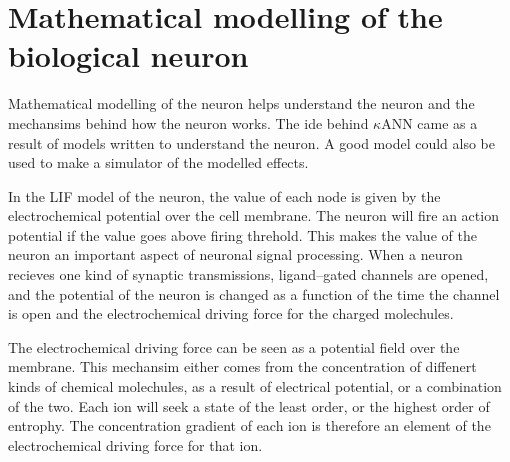 
% 
% 
%

\section{Mathematical modelling of the biological neuron} 
\label{secMatematiskModelleringAvBioNeuron}


Mathematical modelling of the neuron helps understand the neuron and the mechansims behind how the neuron works.
The ide behind $\kappa$ANN came as a result of models written to understand the neuron.
A good model could also be used to make a simulator of the modelled effects. 

In the LIF model of the neuron,  the value of each node is given by the electrochemical potential over the cell membrane. 
The neuron will fire an action potential if the value goes above firing threhold.
This makes the value of the neuron an important aspect of neuronal signal processing.
When a neuron recieves one kind of synaptic transmissions, ligand--gated channels are opened, and the potential of the neuron is changed as a function of the time the channel is open 
	and the electrochemical driving force for the charged molechules.

The electrochemical driving force can be seen as a potential field over the membrane.
This mechansim either comes from the concentration of diffenert kinds of chemical molechules, as a result of electrical potential, or a combination of the two.
Each ion will seek a state of the least order, or the highest order of entrophy. 
The concentration gradient of each ion is therefore an element of the electrochemical driving force for that ion.

